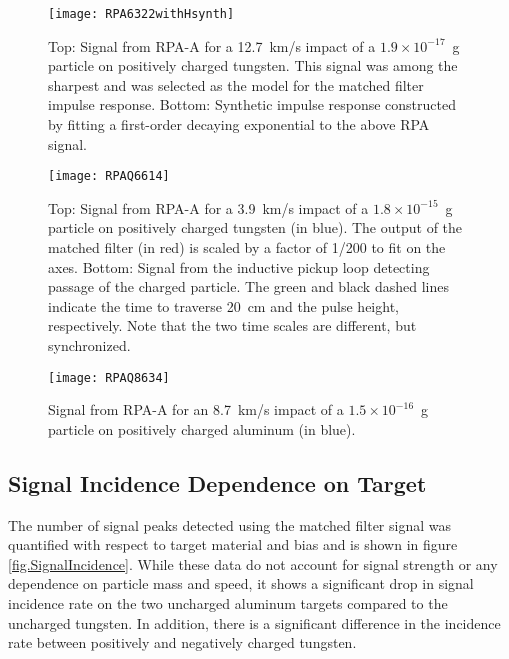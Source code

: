 \begin{figure}[\floatplace]
\begin{center}
\texttt{[image: RPA6322withHsynth]}
\end{center}
\caption{\label{fig.RPA6322withHsynth} Top: Signal from RPA-A for a 12.7~km/s impact of a $1.9\times10^{-17}$~g particle on positively charged tungsten.  This signal was among the sharpest and was selected as the model for the matched filter impulse response.  Bottom: Synthetic impulse response constructed by fitting a first-order decaying exponential to the above RPA signal.}
\end{figure}

\begin{figure}[\floatplace]
\begin{center}
\texttt{[image: RPAQ6614]}
\end{center}
\caption{\label{fig.RPAQ6614} Top: Signal from RPA-A for a 3.9~km/s impact of a $1.8\times10^{-15}$~g particle on positively charged tungsten (in blue).  The output of the matched filter (in red) is scaled by a factor of 1/200 to fit on the axes.  Bottom: Signal from the inductive pickup loop detecting passage of the charged particle.  The green and black dashed lines indicate the time to traverse 20~cm and the pulse height, respectively.  Note that the two time scales are different, but synchronized.}
\end{figure}

\begin{figure}[\floatplace]
\begin{center}
\texttt{[image: RPAQ8634]}
\end{center}
\caption{\label{fig.RPAQ8634} Signal from RPA-A for an 8.7~km/s impact of a $1.5\times10^{-16}$~g particle on positively charged aluminum (in blue).}
\end{figure}
\clearpage

\subsection{Signal Incidence Dependence on Target}
The number of signal peaks detected using the matched filter signal was quantified with respect to target material and bias and is shown in figure \ref{fig.SignalIncidence}.  While these data do not account for signal strength or any dependence on particle mass and speed, it shows a significant drop in signal incidence rate on the two uncharged aluminum targets compared to the uncharged tungsten.  In addition, there is a significant difference in the incidence rate between positively and negatively charged tungsten.

